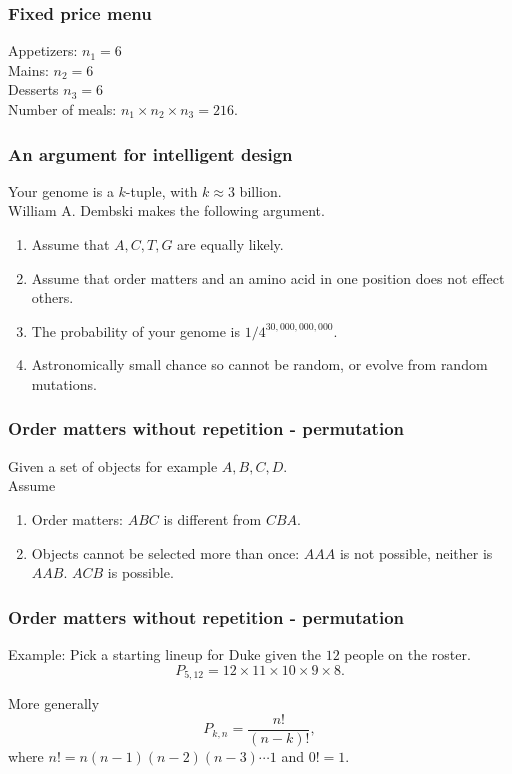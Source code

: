 \begin{frame}[fragile]\frametitle{Fixed price menu}

Appetizers: $n_1 = 6$ \\
Mains: $n_2 = 6$ \\
Desserts $n_3 = 6$ \\

Number of meals: $n_1 \times n_2 \times n_3 = 216$.
\end{frame}

\begin{frame}[fragile]\frametitle{An argument for intelligent design}


Your genome is a $k$-tuple, with $k \approx 3$ billion. \\ 

William A. Dembski makes the following argument.
\begin{enumerate}
\item Assume that $A,C,T,G$ are equally likely. 
\item Assume that order matters and an amino acid in one position
does not effect others. 
\item The probability of your genome is $1/4^{30,000,000,000}$. 
\item Astronomically small chance so cannot be random, or evolve from
random mutations.
\end{enumerate}

\end{frame}

\begin{frame}[fragile]\frametitle{Order matters without repetition - permutation}

Given a set of objects for example $A,B,C,D$. \\
 
Assume
\begin{enumerate}

\item Order matters: $ABC$ is different from $CBA$.

\item Objects cannot be selected more than once: $AAA$ is not possible,
neither is $AAB$. $ACB$ is possible.

\end{enumerate}

\end{frame}

\begin{frame}[fragile]\frametitle{Order matters without repetition - permutation}

Example: Pick a starting lineup for Duke given 
the $12$ people on the roster. \\


$$P_{5,12} = 12  \times 11  \times 10  \times 9
 \times 8.$$ 
  
More generally
$$P_{k,n} = \frac{n!}{(n-k)!},$$
where $n! = n(n-1)(n-2)(n-3)\cdots 1$ and $0! = 1$. \\

\end{frame}

